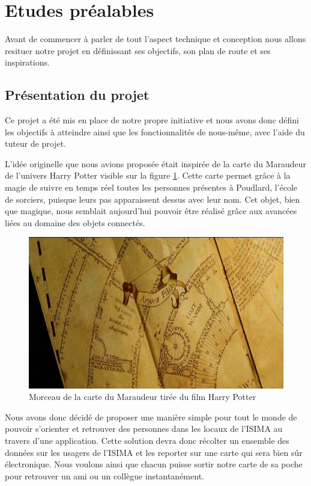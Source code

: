 \section{Etudes préalables}

Avant de commencer à parler de tout l’aspect technique et conception nous allons resituer notre projet en définissant ses objectifs, son plan de route et ses inspirations.

\subsection{Présentation du projet}

Ce projet a été mis en place de notre propre initiative et nous avons donc défini les objectifs à atteindre ainsi que les fonctionnalités de nous-même, avec l'aide du tuteur de projet.

L’idée originelle que nous avions proposée était inspirée de la carte du Maraudeur de l’univers Harry Potter visible sur la figure \ref{marauder}. Cette carte permet grâce à la magie de suivre en temps réel toutes les personnes présentes à Poudlard, l’école de sorciers, puisque leurs pas apparaissent dessus avec leur nom. Cet objet, bien que magique, nous semblait aujourd’hui pouvoir être réalisé grâce aux avancées liées au domaine des objets connectés. 

\begin{figure}[H]
    \centering
    \includegraphics[width=\textwidth]{./img/marauder.jpg}
    \caption{Morceau de la carte du Maraudeur tirée du film Harry Potter}
    \label{marauder}
\end{figure}

Nous avons donc décidé de proposer une manière simple pour tout le monde de pouvoir s'orienter et retrouver des personnes dans les locaux de l'ISIMA au travers d’une application. Cette solution devra donc récolter un ensemble des données sur les usagers de l’ISIMA et les reporter sur une carte qui sera bien sûr électronique. Nous voulons ainsi que chacun puisse sortir notre carte de sa poche pour retrouver un ami ou un collègue instantanément.

